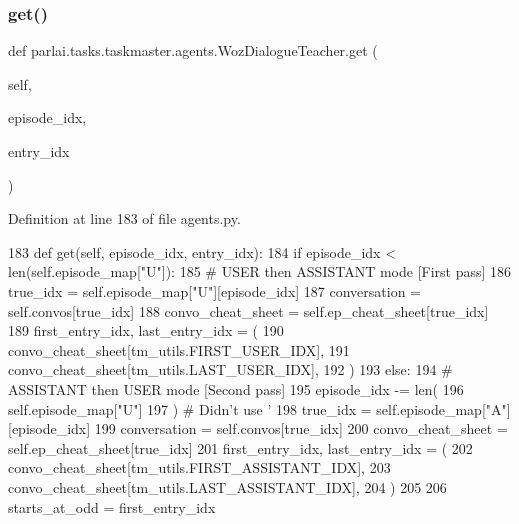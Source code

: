 \subsubsection{\texorpdfstring{get()}{get()}}
{\footnotesize\ttfamily def parlai.\+tasks.\+taskmaster.\+agents.\+Woz\+Dialogue\+Teacher.\+get (\begin{DoxyParamCaption}\item[{}]{self,  }\item[{}]{episode\+\_\+idx,  }\item[{}]{entry\+\_\+idx }\end{DoxyParamCaption})}



Definition at line 183 of file agents.\+py.


\begin{DoxyCode}
183     \textcolor{keyword}{def }get(self, episode\_idx, entry\_idx):
184         \textcolor{keywordflow}{if} episode\_idx < len(self.episode\_map[\textcolor{stringliteral}{"U"]):}
185 \textcolor{stringliteral}{            }\textcolor{comment}{# USER then ASSISTANT mode [First pass]}
186             true\_idx = self.episode\_map[\textcolor{stringliteral}{"U"][episode\_idx]}
187 \textcolor{stringliteral}{            conversation = self.convos[true\_idx]}
188 \textcolor{stringliteral}{            convo\_cheat\_sheet = self.ep\_cheat\_sheet[true\_idx]}
189 \textcolor{stringliteral}{            first\_entry\_idx, last\_entry\_idx = (}
190 \textcolor{stringliteral}{                convo\_cheat\_sheet[tm\_utils.FIRST\_USER\_IDX],}
191 \textcolor{stringliteral}{                convo\_cheat\_sheet[tm\_utils.LAST\_USER\_IDX],}
192 \textcolor{stringliteral}{            )}
193 \textcolor{stringliteral}{        }\textcolor{keywordflow}{else}:
194             \textcolor{comment}{# ASSISTANT then USER mode [Second pass]}
195             episode\_idx -= len(
196                 self.episode\_map[\textcolor{stringliteral}{"U"]}
197 \textcolor{stringliteral}{            )  }\textcolor{comment}{# Didn't use '%
198             true\_idx = self.episode\_map[\textcolor{stringliteral}{"A"}][episode\_idx]
199             conversation = self.convos[true\_idx]
200             convo\_cheat\_sheet = self.ep\_cheat\_sheet[true\_idx]
201             first\_entry\_idx, last\_entry\_idx = (
202                 convo\_cheat\_sheet[tm\_utils.FIRST\_ASSISTANT\_IDX],
203                 convo\_cheat\_sheet[tm\_utils.LAST\_ASSISTANT\_IDX],
204             )
205 
206         starts\_at\_odd = first\_entry\_idx %
}
\end{DoxyCode}
